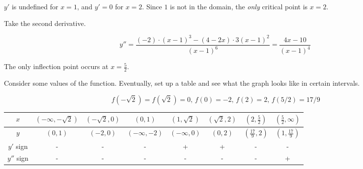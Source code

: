 \documentclass{article}
\begin{document}
\hfill

\noindent $y'$ is undefined for $x=1$, and $y'=0$ for $x=2$. Since $1$ is not in the domain, the \textit{only} critical point is $x = 2$.

\hfill

\noindent Take the second derivative.

\begin{equation*}y'' = \frac{(-2)\cdot(x-1)^3-(4-2x)\cdot3(x-1)^2 }{(x-1)^6}=\frac{4x-10}{(x-1)^4}\end{equation*}

\hfill

\noindent The only inflection point occurs at $\displaystyle x=\frac52$.

\hfill

\noindent Consider some values of the function. Eventually, set up a table and see what the graph looks like in certain intervals.

\begin{equation*}\,f\left(-\sqrt2\right)=f\left(\sqrt2\right)=0,\,f(0)=-2,\,f(2)=2,\,f(5/2)=17/9\end{equation*}

\begin{center}
    \large
    \begin{tabular}{ |c| c c c c c c c| } 
    \hline
        $x$ & $\left(-\infty, -\sqrt2\right)$ & $\left(-\sqrt2, 0\right)$&$\left(0, 1\right)$ & $\left(1,\sqrt2\right)$ & $\left(\sqrt2, 2\right)$ & $\left(2, \frac52\right)$ & $\left(\frac52, \infty\right)$  \\
        \hline
        $y$ & $(0, 1)$ &$(-2,0)$ & $(-\infty, -2)$& $(-\infty, 0)$& $(0, 2)$& $\left(\frac{17}9, 2\right)$& $\left(1, \frac{17}9\right)$\\
        \hline
        $y'$ sign & - & - & - &+&+&-&- \\
        \hline
        $y''$ sign & - &- &-&-&-&-&+ \\
        \hline
    \end{tabular}
\end{center}

\hfill

\begin{center}
\end{center}
\end{document}
